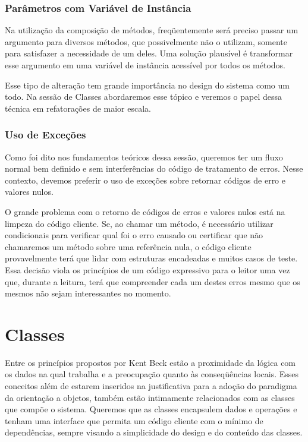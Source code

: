 \subsubsection{Parâmetros com Variável de Instância}
Na utilização da composição de métodos, freqüentemente será preciso passar um argumento para diversos métodos, que possivelmente não o utilizam, somente para satisfazer a necessidade de um deles. Uma solução plausível é transformar esse argumento em uma variável de instância acessível por todos os métodos.
	
Esse tipo de alteração tem grande importância no design do sistema como um todo. Na sessão de Classes abordaremos esse tópico e veremos o papel dessa técnica em refatorações de maior escala.

\subsubsection{Uso de Exceções}
Como foi dito nos fundamentos teóricos dessa sessão, queremos ter um fluxo normal bem definido e sem interferências do código de tratamento de erros. Nesse contexto, devemos preferir o uso de exceções sobre retornar códigos de erro e valores nulos.
	
O grande problema com o retorno de códigos de erros e valores nulos está na limpeza do código cliente. Se, ao chamar um método, é necessário utilizar condicionais para verificar qual foi o erro causado ou certificar que não chamaremos um método sobre uma referência nula, o código cliente provavelmente terá que lidar com estruturas encadeadas e muitos casos de teste. Essa decisão viola os princípios de um código expressivo para o leitor uma vez que, durante a leitura, terá que compreender cada um destes erros mesmo que os mesmos não sejam interessantes no momento.

\section{Classes}
\label{sec:classes}

Entre os princípios propostos por Kent Beck estão a proximidade da lógica com os dados na qual trabalha e a preocupação quanto às conseqüências locais. Esses conceitos além de estarem inseridos na justificativa para a adoção do paradigma da orientação a objetos, também estão intimamente relacionados com as classes que compõe o sistema. Queremos que as classes encapsulem dados e operações e tenham uma interface que permita um código cliente com o mínimo de dependências, sempre visando a simplicidade do design e do conteúdo das classes.
	
